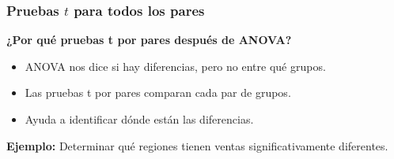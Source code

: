 \documentclass[aspectratio=169]{beamer}
\begin{document}
\begin{frame}
    \frametitle{Pruebas $t$ para todos los pares}
    \textbf{¿Por qué pruebas t por pares después de ANOVA?}
    \begin{itemize}
        \item ANOVA nos dice si hay diferencias, pero no entre qué grupos.
        \item Las pruebas t por pares comparan cada par de grupos.
        \item Ayuda a identificar dónde están las diferencias.
    \end{itemize}

\vfill
    \textbf{Ejemplo:} Determinar qué regiones tienen ventas significativamente diferentes.
\end{frame}
\end{document}
